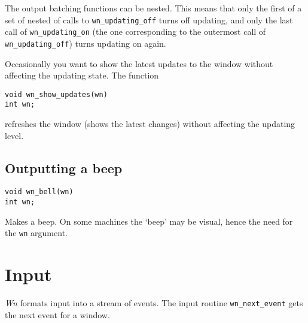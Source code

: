 \hspace{0.5in}{\tt wn\_updating\_off(wn);}

\hspace{0.5in}{\em lots of graphical output to the window}

\hspace{0.5in}{\tt wn\_updating\_on(wn);}

The output batching functions can be nested.
This means that only the first of a set of nested of calls
to {\tt wn\_updating\_off} turns off updating, and only the last call
of {\tt wn\_updating\_on} (the one corresponding to the outermost call of
{\tt wn\_updating\_off}) turns updating on again.

Occasionally you want to show the latest updates to the window without
affecting the updating state. The function
\begin{verbatim}
void wn_show_updates(wn)
int wn;
\end{verbatim}
refreshes the window (shows the latest changes) without affecting the
updating level.
\subsection{Outputting a beep}
\begin{verbatim}
void wn_bell(wn)
int wn;
\end{verbatim}
Makes a beep.
On some machines the `beep' may be visual, hence the need for the
{\tt wn} argument.
\section{Input}
{\em Wn} formats input into a stream of events.
The input routine {\tt wn\_next\_event} gets the next event for a window.
